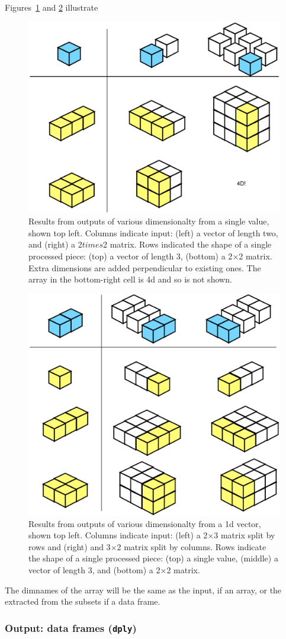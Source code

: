 \documentclass[letterpage]{scrartcl}
\begin{document}
Figures~\ref{fig:function-1d} and \ref{fig:function-2d} illustrate 

\begin{figure}[htbp]
  \centering
  \includegraphics[width= 0.45 \textwidth]{function-1d}
  \caption{Results from outputs of various dimensionalty from a single value, shown top left.  Columns indicate input: (left) a vector of length two, and (right) a 2$times$2 matrix.  Rows indicated the shape of a single processed piece: (top) a vector of length 3, (bottom) a 2$\times$2 matrix.  Extra dimensions are added perpendicular to existing ones.  The array in the bottom-right cell is 4d and so is not shown.}
  \label{fig:function-1d}
\end{figure}

\begin{figure}[htbp]
  \centering
  \includegraphics[width= 0.45 \textwidth]{function-2d}
  \caption{Results from outputs of various dimensionalty from a 1d vector, shown top left.  Columns indicate input: (left) a 2$\times$3 matrix split by rows and (right) and 3$\times$2 matrix split by columns.  Rows indicate the shape of a single processed piece: (top) a single value, (middle) a vector of length 3, and (bottom) a 2$\times$2 matrix.}
  \label{fig:function-2d}
\end{figure}

The dimnames of the array will be the same as the input, if an array, or the extracted from the subsets if a data frame.

\subsubsection{Output: data frames ({\tt *dply})}
\end{document}
